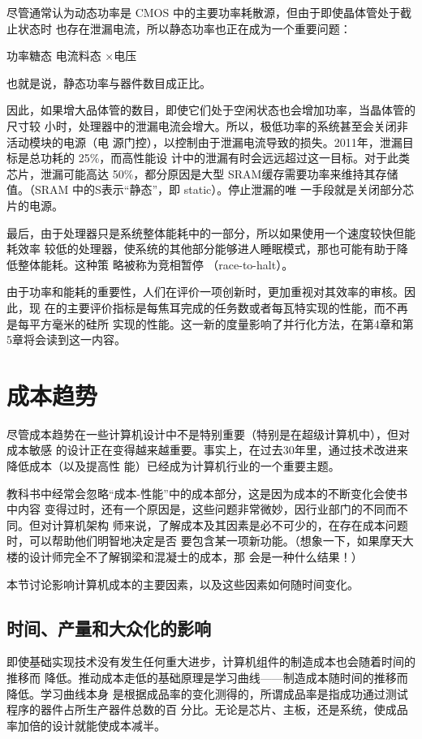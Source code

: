 尽管通常认为动态功率是 CMOS 中的主要功率耗散源，但由于即使晶体管处于截止状态时
也存在泄漏电流，所以静态功率也正在成为一个重要问题：

功率糖态 电流料态 ×电压

也就是说，静态功率与器件数目成正比。

因此，如果增大品体管的数目，即使它们处于空闲状态也会增加功率，当晶体管的尺寸较
小时，处理器中的泄漏电流会增大。所以，极低功率的系统甚至会关闭非活动模块的电源（电
源门控），以控制由于泄漏电流导致的损失。2011年，泄漏目标是总功耗的 25\%，而高性能设
计中的泄漏有时会远远超过这一目标。对于此类芯片，泄漏可能高达 50\%，都分原因是大型
SRAM缓存需要功率来维持其存储值。（SRAM 中的S表示“静态”，即 static）。停止泄漏的唯
一手段就是关闭部分芯片的电源。

最后，由于处理器只是系统整体能耗中的一部分，所以如果使用一个速度较快但能耗效率
较低的处理器，使系统的其他部分能够进人睡眠模式，那也可能有助于降低整体能耗。这种策
略被称为竞相暂停 （race-to-halt）。

由于功率和能耗的重要性，人们在评价一项创新时，更加重视对其效率的审核。因此，现
在的主要评价指标是每焦耳完成的任务数或者每瓦特实现的性能，而不再是每平方毫米的硅所
实现的性能。这一新的度量影响了并行化方法，在第4章和第5章将会读到这一内容。

\section{成本趋势}
尽管成本趋势在一些计算机设计中不是特别重要（特别是在超级计算机中），但对成本敏感
的设计正在变得越来越重要。事实上，在过去30年里，通过技术改进来降低成本（以及提高性
能）已经成为计算机行业的一个重要主题。

教科书中经常会忽略“成本-性能”中的成本部分，这是因为成本的不断变化会使书中内容
变得过时，还有一个原因是，这些问题非常微妙，因行业部门的不同而不同。但对计算机架构
师来说，了解成本及其因素是必不可少的，在存在成本问题时，可以帮助他们明智地决定是否
要包含某一项新功能。（想象一下，如果摩天大楼的设计师完全不了解钢梁和混凝士的成本，那
会是一种什么结果！）

本节讨论影响计算机成本的主要因素，以及这些因素如何随时间变化。

\subsection{时间、产量和大众化的影响}

即使基础实现技术没有发生任何重大进步，计算机组件的制造成本也会随着时间的推移而
降低。推动成本走低的基础原理是学习曲线——制造成本随时间的推移而降低。学习曲线本身
是根据成品率的变化测得的，所谓成品率是指成功通过测试程序的器件占所生产器件总数的百
分比。无论是芯片、主板，还是系统，使成品率加倍的设计就能使成本减半。

